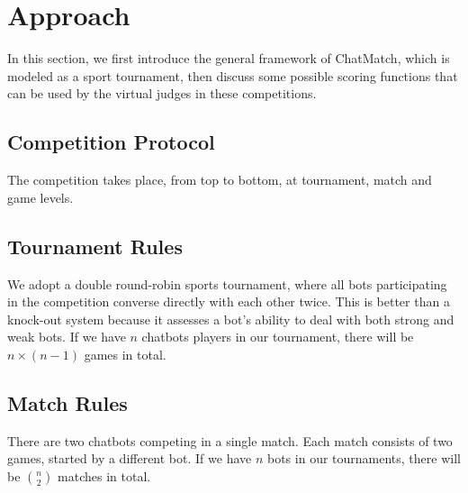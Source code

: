 \section{Approach}
\label{sec:approach}
In this section, we first introduce the general framework of ChatMatch, which is modeled as
a sport tournament, then discuss some possible scoring functions that can be used by
the virtual judges in these competitions.


\subsection{Competition Protocol}
\label{sec:competition}
The competition takes place, from top to bottom, at tournament, match and
game levels.

\subsection*{Tournament Rules}
We adopt a double round-robin 
sports tournament, where all bots participating in the competition 
converse directly with each other twice.
This is better than a knock-out system because it assesses a bot's ability to
deal with both strong and weak bots.
If we have $n$ chatbots players in our tournament, 
there will be $n\times (n-1) $ games in total.

\subsection*{Match Rules}
There are two chatbots competing in a single match. 
Each match consists of two games,
 started by a different bot. 
If we have $n$ bots in our tournaments, there 
will be ${n \choose 2}$ matches in total. 

